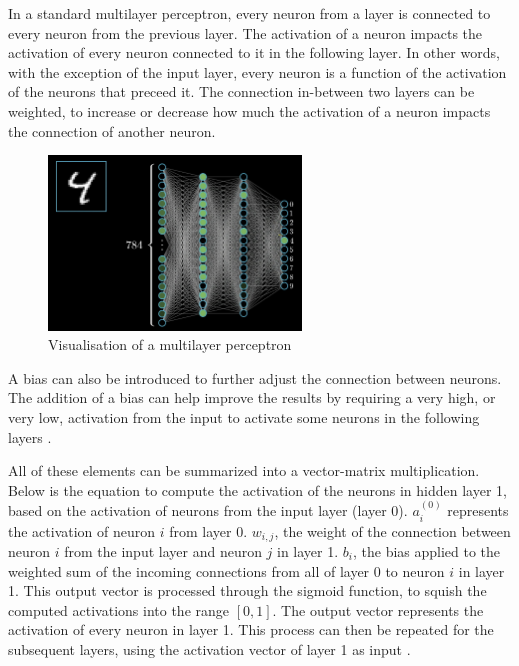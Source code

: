 \documentclass[12pt,a4paper,notitlepage]{article}
\begin{document}
In a standard multilayer perceptron, every neuron from a layer is connected to every neuron from the previous layer. The activation of a neuron impacts the activation of every neuron connected to it in the following layer. In other words, with the exception of the input layer, every neuron is a function of the activation of the neurons that preceed it. The connection in-between two layers can be weighted, to increase or decrease how much the activation of a neuron impacts the connection of another neuron.

\begin{figure}[htbp]
	\centering
		\includegraphics[width=0.60\textwidth]{images/perceptron-visualisation.png}
	\caption{Visualisation of a multilayer perceptron \cite{sanderson_gradient_2017}}
	\label{fig:perceptron-visualisation}
\end{figure}

A bias can also be introduced to further adjust the connection between neurons. The addition of a bias can help improve the results by requiring a very high, or very low, activation from the input to activate some neurons in the following layers \cite{sanderson_but_2017}.

All of these elements can be summarized into a vector-matrix multiplication. Below is the equation to compute the activation of the neurons in hidden layer 1, based on the activation of neurons from the input layer (layer 0). \(a_i^{(0)}\) represents the activation of neuron \(i\) from layer 0. \(w_{i,j}\), the weight of the connection between neuron \(i\) from the input layer and neuron \(j\) in layer 1. \(b_i\), the bias applied to the weighted sum of the incoming connections from all of layer 0 to neuron \(i\) in layer 1. This output vector is processed through the sigmoid function, to squish the computed activations into the range \([0,1]\). The output vector represents the activation of every neuron in layer 1. This process can then be repeated for the subsequent layers, using the activation vector of layer 1 as input \cite{sanderson_but_2017}.
\end{document}
